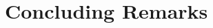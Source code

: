 \documentclass[pageno]{sig-alternate-05-2015}
\newcommand{\mysection}[1]{\section{#1}}
\newcommand{\myparagraph}[1]{\indent\par\noindent\textsf{\textbf{#1.}}}
\newcommand{\ie}{\textit{i.e.,}}
\newcommand{\adhoc}{ad hoc}
\begin{document}
% 





%
%

% 

\mysection{Concluding Remarks}
\label{section:conclusions}

\end{document}
